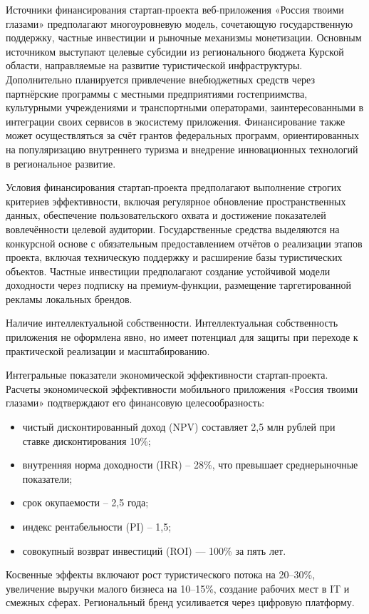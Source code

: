 Источники финансирования стартап-проекта веб-приложения «Россия твоими глазами» предполагают многоуровневую модель, сочетающую государственную поддержку, частные инвестиции и рыночные механизмы монетизации. Основным источником выступают целевые субсидии из регионального бюджета Курской области, направляемые на развитие туристической инфраструктуры. Дополнительно планируется привлечение внебюджетных средств через партнёрские программы с местными предприятиями гостеприимства, культурными учреждениями и транспортными операторами, заинтересованными в интеграции своих сервисов в экосистему приложения. Финансирование также может осуществляться за счёт грантов федеральных программ, ориентированных на популяризацию внутреннего туризма и внедрение инновационных технологий в региональное развитие.

Условия финансирования стартап-проекта предполагают выполнение строгих критериев эффективности, включая регулярное обновление пространственных данных, обеспечение пользовательского охвата и достижение показателей вовлечённости целевой аудитории. Государственные средства выделяются на конкурсной основе с обязательным предоставлением отчётов о реализации этапов проекта, включая техническую поддержку и расширение базы туристических объектов. Частные инвестиции предполагают создание устойчивой модели доходности через подписку на премиум-функции, размещение таргетированной рекламы локальных брендов.

Наличие интеллектуальной собственности. Интеллектуальная собственность приложения не оформлена явно, но имеет потенциал для защиты при переходе к практической реализации и масштабированию.

Интегральные показатели экономической эффективности стартап-проекта. Расчеты экономической эффективности мобильного приложения «Россия твоими глазами» подтверждают его финансовую целесообразность:
\begin{itemize}
	\item чистый дисконтированный доход (NPV) составляет 2,5 млн рублей при ставке дисконтирования 10\%;
	\item внутренняя норма доходности (IRR) – 28\%, что превышает среднерыночные показатели;
	\item срок окупаемости – 2,5 года;
	\item индекс рентабельности (PI) – 1,5;
	\item совокупный возврат инвестиций (ROI) — 100\% за пять лет.  
\end{itemize}

Косвенные эффекты включают рост туристического потока на 20–30\%, увеличение выручки малого бизнеса на 10–15\%, создание рабочих мест в IT и смежных сферах. Региональный бренд усиливается через цифровую платформу.

